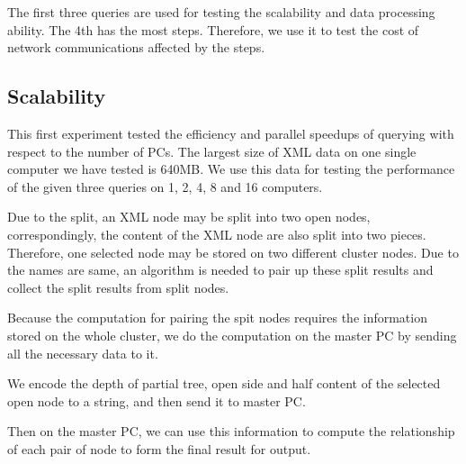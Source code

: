 The first three queries are used for testing the scalability and data processing ability. 
The 4th has the most steps. Therefore, we use it to test the cost of 
network communications affected by the steps.

\subsection{Scalability}

This first experiment tested the efficiency and parallel speedups of 
querying with respect to the number of PCs. The largest size of XML data 
on one single computer we have tested is 640MB. We use this data 
for testing the performance of the given three queries on 1, 2, 4, 8 and 16 computers.

Due to the split, an XML node may be split into two 
open nodes, correspondingly, the content of the XML 
node are also split into two pieces. Therefore, one selected 
node may be stored on two different cluster nodes. Due to 
the names are same, an algorithm is needed to pair up these 
split results and collect the split results from split nodes.  

Because the computation for pairing the spit nodes 
requires the information stored on the whole cluster, we do 
the computation on the master PC by sending all the 
necessary data to it. 

We encode the depth of partial tree, open side and half 
content of the selected open node to a string, and then send 
it to master PC. 

Then on the master PC, we can use this information to 
compute the relationship of each pair of node to form the 
final result for output. 

